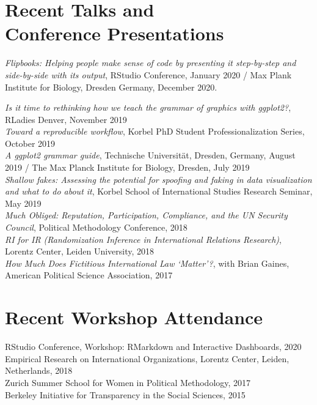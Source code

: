 \documentclass[margin, 10pt]{CVStyleTemplate}\usepackage[]{graphicx}\usepackage[]{color}
\begin{document}
\begin{resume}
% 
% 
% 


\section{Recent Talks and \\ Conference Presentations}



\emph{Flipbooks: Helping people make sense of code by presenting it step-by-step and side-by-side with its output},
RStudio Conference, January 2020 / 
Max Plank Institute for Biology, Dresden Germany, December 2020. 

%
\emph{Is it time to rethinking how we teach the grammar of graphics with ggplot2?}, RLadies Denver, November 2019\\[6pt]
%
\emph{Toward a reproducible workflow},  Korbel PhD Student Professionalization Series, October 2019 \\[6pt]
%
\emph{A ggplot2 grammar guide}, Technische Universit\"{a}t, Dresden, Germany, August 2019 / The Max Planck Institute for Biology, Dresden, July 2019 \\[6pt]
%
\emph{Shallow fakes: Assessing the potential for spoofing and faking in data visualization and what to do about it}, Korbel School of International Studies Research Seminar, May 2019 \\[6pt]
%
\emph{Much Obliged: Reputation, Participation, Compliance, and the UN Security Council}, Political Methodology Conference, 2018 \\[6pt]
%
\emph{RI for IR (Randomization Inference in International Relations Research)}, Lorentz Center, Leiden University, 2018\\[6pt] %
%
\emph{How Much Does Fictitious International Law `Matter'?}, with Brian Gaines, American Political Science Association, 2017 \\[6pt]%


\section{Recent Workshop Attendance}

RStudio Conference, Workshop: RMarkdown and Interactive Dashboards, 2020 \\[6pt] 
Empirical Research on International Organizations, Lorentz Center, Leiden, Netherlands, 2018 \\[6pt] 
Zurich Summer School for Women in Political Methodology, 2017\\[6pt]
Berkeley Initiative for Transparency in the Social Sciences, 2015\\[6pt]%


\end{resume}
\end{document}
